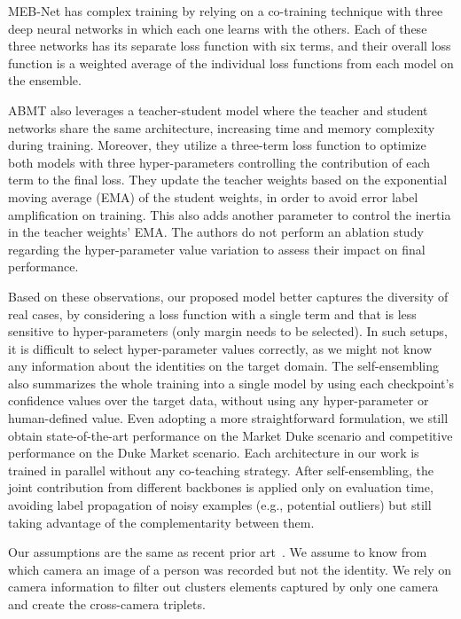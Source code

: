 \documentclass[journal]{IEEEtran}
\begin{document}
MEB-Net has complex training by relying on a co-training technique with three deep neural networks in which each one learns with the others. Each of these three networks has its separate loss function with six terms, and their overall loss function is a weighted average of the individual loss functions from each model on the ensemble. 

ABMT also leverages a teacher-student model where the teacher and student networks share the same architecture, increasing time and memory complexity during training. Moreover, they utilize a three-term loss function to optimize both models with three hyper-parameters controlling the contribution of each term to the final loss. They update the teacher weights based on the exponential moving average (EMA) of the student weights, in order to avoid error label amplification on training. This also adds another parameter to control the inertia in the teacher weights' EMA. The authors do not perform an ablation study regarding the hyper-parameter value variation to assess their impact on final performance. 

Based on these observations, our proposed model better captures the diversity of real cases, by considering a loss function with a single term and that is less sensitive to hyper-parameters (only margin  needs to be selected). In such setups, it is difficult to select hyper-parameter values correctly, as we might not know any information about the identities on the target domain. The self-ensembling also summarizes the whole training into a single model by using each checkpoint's confidence values over the target data, without using any hyper-parameter or human-defined value. Even adopting a more straightforward formulation, we still obtain state-of-the-art performance on the Market  Duke scenario and competitive performance on the Duke  Market scenario. Each architecture in our work is trained in parallel without any co-teaching strategy. After self-ensembling, the joint contribution from different backbones is applied only on evaluation time, avoiding label propagation of noisy examples (e.g., potential outliers) but still taking advantage of the complementarity between them.

Our assumptions are the same as recent prior art~\cite{zhai2020ad, zhong2020learning, lin2020unsupervisedccse}. We assume to know from which camera an image of a person was recorded but not the identity. We rely on camera information to filter out clusters elements captured by only one camera and create the cross-camera triplets.
\end{document}
